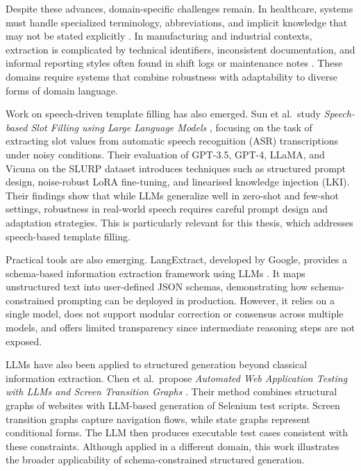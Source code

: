 Despite these advances, domain-specific challenges remain. In healthcare, systems must handle specialized terminology, abbreviations, and implicit knowledge that may not be stated explicitly \cite{friedman2004survey}. In manufacturing and industrial contexts, extraction is complicated by technical identifiers, inconsistent documentation, and informal reporting styles often found in shift logs or maintenance notes \cite{wang2021slu}. These domains require systems that combine robustness with adaptability to diverse forms of domain language.

Work on speech-driven template filling has also emerged. Sun et al.\ study \textit{Speech-based Slot Filling using Large Language Models} \cite{sun2023slot}, focusing on the task of extracting slot values from automatic speech recognition (ASR) transcriptions under noisy conditions. Their evaluation of GPT-3.5, GPT-4, LLaMA, and Vicuna on the SLURP dataset introduces techniques such as structured prompt design, noise-robust LoRA fine-tuning, and linearised knowledge injection (LKI). Their findings show that while LLMs generalize well in zero-shot and few-shot settings, robustness in real-world speech requires careful prompt design and adaptation strategies. This is particularly relevant for this thesis, which addresses speech-based template filling.

Practical tools are also emerging. LangExtract, developed by Google, provides a schema-based information extraction framework using LLMs \cite{google2024langextract}. It maps unstructured text into user-defined JSON schemas, demonstrating how schema-constrained prompting can be deployed in production. However, it relies on a single model, does not support modular correction or consensus across multiple models, and offers limited transparency since intermediate reasoning steps are not exposed.

LLMs have also been applied to structured generation beyond classical information extraction. Chen et al.\ propose \textit{Automated Web Application Testing with LLMs and Screen Transition Graphs} \cite{chen2024webforms}. Their method combines structural graphs of websites with LLM-based generation of Selenium test scripts. Screen transition graphs capture navigation flows, while state graphs represent conditional forms. The LLM then produces executable test cases consistent with these constraints. Although applied in a different domain, this work illustrates the broader applicability of schema-constrained structured generation.

